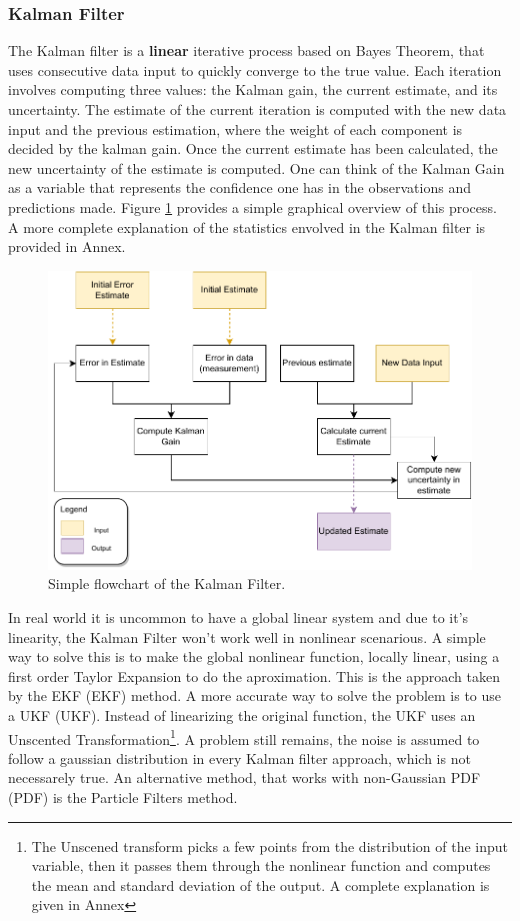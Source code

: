 \subsubsection{Kalman Filter}
The Kalman filter is a \textbf{linear} iterative process based on Bayes Theorem, that uses consecutive data input to quickly converge to the true value. Each iteration involves computing three values: the Kalman gain, the current estimate, and its uncertainty. The estimate of the current iteration is computed with the new data input and the previous estimation, where the weight of each component is decided by the kalman gain. Once the current estimate has been calculated, the new uncertainty of the estimate is computed. One can think of the Kalman Gain as a variable that represents the confidence one has in the observations and predictions made. Figure \ref*{fig: flowchart kalman} provides a simple graphical overview of this process. A more complete explanation of the statistics envolved in the Kalman filter is provided in Annex. 

\begin{figure}[H]
    \centering
    \includegraphics[width=0.5\linewidth]{images/background/Kalman-diagram.pdf}
    \caption{Simple flowchart of the Kalman Filter.}
    \label{fig: flowchart kalman}
\end{figure}

In real world it is uncommon to have a global linear system and due to it's linearity, the Kalman Filter won't work well in nonlinear scenarious. A simple way to solve this is to make the global nonlinear function, locally linear, using a first order Taylor Expansion to do the aproximation. This is the approach taken by the \acl{EKF} (\acs*{EKF}) method. A more accurate way to solve the problem is to use a \acl*{UKF} (\acs*{UKF}). Instead of linearizing the original function, the \acs*{UKF} uses an Unscented Transformation\footnote{The Unscened transform picks a few points from the distribution of the input variable, then it passes them through the nonlinear function and computes the mean and standard deviation of the output. A complete explanation is given in Annex}. A problem still remains, the noise is assumed to follow a gaussian distribution in every Kalman filter approach, which is not necessarely true. An alternative method, that works with non-Gaussian \acl*{PDF} (\acs*{PDF}) is the Particle Filters method.

